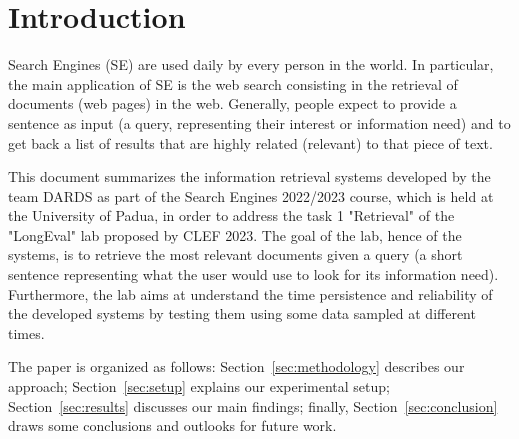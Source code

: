 \section{Introduction}
\label{sec:introduction}
%
%

Search Engines (SE) are used daily by every person in the world. In particular, the main application of SE is the web search consisting in the retrieval of documents (web pages) in the web. Generally, people expect to provide a sentence as input (a query, representing their interest or information need) and to get back a list of results that are highly related (relevant) to that piece of text.
\par
This document summarizes the information retrieval systems developed by the team DARDS as part of the Search Engines 2022/2023 course, which is held at the University of Padua, in order to address the task 1 "Retrieval" of the "LongEval" lab proposed by CLEF 2023. The goal of the lab, hence of the systems, is to retrieve the most relevant documents given a query (a short sentence representing what the user would use to look for its information need). Furthermore, the lab aims at understand the time persistence and reliability of the developed systems by testing them using some data sampled at different times.

\par
The paper is organized as follows: Section~\ref{sec:methodology} describes our approach; Section~\ref{sec:setup} explains our experimental setup; Section~\ref{sec:results} discusses our main findings; finally, Section~\ref{sec:conclusion} draws some conclusions and outlooks for future work.
